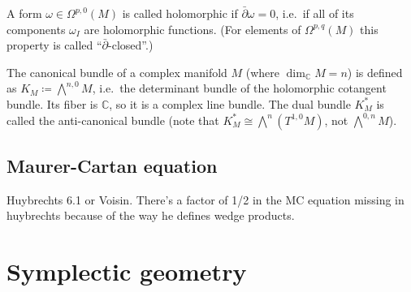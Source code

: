 \begin{defn}
    A form $\omega\in\Omega^{p,0}(M)$ is called holomorphic if $\bar\partial\omega=0$, i.e.\ if all of its components $\omega_I$ are holomorphic functions. (For elements of $\Omega^{p,q}(M)$ this property is called ``$\bar\partial$-closed''.)
\end{defn}

\begin{defn}
    The canonical bundle of a complex manifold $M$ (where $\dim_\mathbb{C} M=n$) is defined as $K_M\coloneqq \bigwedge^{n,0}M$, i.e.\ the determinant bundle of the holomorphic cotangent bundle. Its fiber is $\mathbb{C}$, so it is a complex line bundle. The dual bundle $K^\ast_M$ is called the anti-canonical bundle (note that $K^\ast_M\cong \bigwedge^n(T^{1,0}M)$, not $\bigwedge^{0,n}M$).
\end{defn}



\subsection{Maurer-Cartan equation}

Huybrechts 6.1 or Voisin. There's a factor of 1/2 in the MC equation missing in huybrechts because of the way he defines wedge products.




\section{Symplectic geometry}



